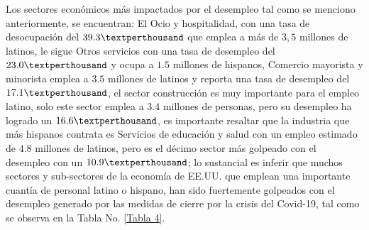 Los sectores económicos más impactados por el desempleo tal como se menciono anteriormente, se encuentran: El Ocio y hospitalidad, con una tasa de desocupación del $39.3\textperthousand$ que emplea a más de $3,5$ millones de latinos, le sigue Otros servicios con una tasa de desempleo del $23.0\textperthousand$ y ocupa a $1.5$ millones de hispanos, Comercio mayorista y minorista emplea a $3.5$ millones de latinos y reporta una tasa de desempleo del $17.1\textperthousand$, el sector construcción es muy importante para el empleo latino, solo este sector emplea a $3.4$ millones de personas, pero su desempleo ha logrado un $16.6\textperthousand$, es importante resaltar que la industria que más hispanos contrata es Servicios de educación y salud con un empleo estimado de $4.8$ millones de latinos, pero es el décimo sector más golpeado con el desempleo con un $10.9\textperthousand$; lo sustancial es inferir que muchos sectores y sub-sectores de la economía de EE.UU. que emplean una importante cuantía de personal latino o hispano, han sido fuertemente golpeados con el desempleo generado por las medidas de cierre por la crisis del Covid-19, tal como se observa en la Tabla No. \eqref{Tabla 4}.


